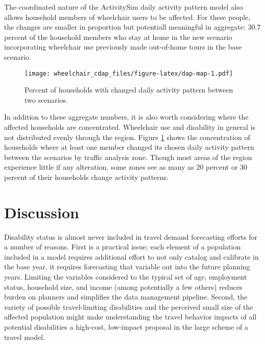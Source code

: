 \documentclass[3p, authoryear, review]{elsarticle} %
\begin{document}
The coordinated nature of the ActivitySim daily activity pattern model also allows
household members of wheelchair users to be affected. For these people,
the changes are smaller in proportion but potentiall meaningful in aggregate:
30.7 percent of the household members who stay at home in the new scenario
incorporating wheelchair use previously made out-of-home tours in the base scenario.

\begin{figure}
\centering
\texttt{[image: wheelchair\_cdap\_files/figure-latex/dap-map-1.pdf]}
\caption{\label{fig:dap-map}Percent of households with changed daily activity pattern between two scenarios.}
\end{figure}

In addition to these aggregate numbers, it is also worth considering where the
affected households are concentrated. Wheelchair use and disability in general
is not distributed evenly through the region. Figure \ref{fig:dap-map} shows the
concentration of households where at least one member changed its chosen
daily activity pattern between the scenarios by traffic analysis zone. Though
most areas of the region experience little if any alteration, some zones see as
many as 20 percent or 30 percent of their households change activity patterns.

\hypertarget{discussion}{%
\section{Discussion}\label{discussion}}

Disability status is almost never included in travel demand forecasting
efforts for a number of reasons. First is a practical issue; each element
of a population included in a model requires additional effort to not only catalog
and calibrate in the base year, it requires forecasting that variable out into
the future planning years. Limiting the variables considered to the typical set
of age, employment status, household size, and income (among potentially a few
others) reduces burden on planners and simplifies the data management pipeline.
Second, the variety of possible travel-limiting disabilities and the perceived
small size of the affected population might make understanding the travel
behavior impacts of all potential disabilities a high-cost, low-impact proposal
in the large scheme of a travel model.
\end{document}
